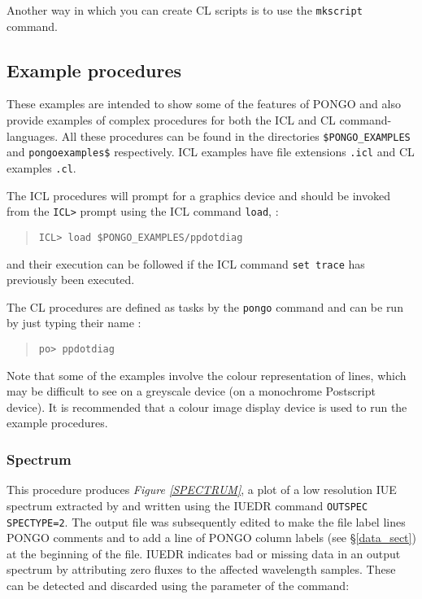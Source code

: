 Another way in which you can create CL scripts is to use the
\verb+mkscript+ command.

\subsection{Example procedures} \label{exam_sect}

These examples are intended to show some of the features of PONGO and
also provide examples of complex procedures for both the ICL and CL
command-languages. All these procedures can be
found in the directories \verb+$PONGO_EXAMPLES+  and
\verb+pongoexamples$+ respectively. ICL examples have file extensions
\verb+.icl+ and CL examples \verb+.cl+.

The ICL procedures will prompt for a graphics device and should be
invoked from the \verb+ICL>+ prompt using the ICL command \verb+load+, \eg:
\begin {quote}
\begin{verbatim}
ICL> load $PONGO_EXAMPLES/ppdotdiag
\end{verbatim}
\end {quote}
and their execution can be followed if the ICL command \verb+set trace+ has
previously been executed.

The CL procedures are defined as tasks by the \verb+pongo+ command and
can be run by just typing their name \ie:
\begin{quote}
\begin{verbatim}
po> ppdotdiag
\end{verbatim}
\end{quote}

Note that some of the examples involve the colour representation of lines,
which may be difficult to see on a greyscale device (\eg on a monochrome
Postscript device).
It is recommended that a colour image display device is used to run the
example procedures.

\newpage

\subsubsection{Spectrum}

This procedure produces {\em Figure \ref{SPECTRUM}}, a plot of a
low resolution
IUE spectrum extracted by  and written using the
IUEDR command \verb+OUTSPEC SPECTYPE=2+.
The output file was subsequently edited to make the file label lines PONGO
comments and to add a line of PONGO column labels (see \S\ref{data_sect})
at the beginning of the file.
IUEDR indicates bad or missing data in an output spectrum by attributing zero
fluxes to the affected wavelength samples.
These can be detected and discarded using the  parameter of
the  command: \eg

